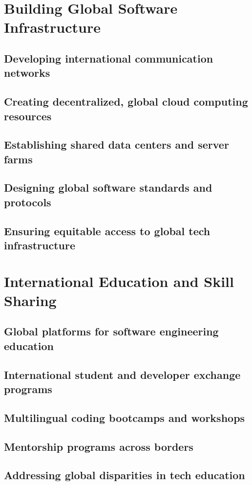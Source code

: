 \section{Building Global Software Infrastructure}
\subsection{Developing international communication networks}
\subsection{Creating decentralized, global cloud computing resources}
\subsection{Establishing shared data centers and server farms}
\subsection{Designing global software standards and protocols}
\subsection{Ensuring equitable access to global tech infrastructure}

\newpage

\section{International Education and Skill Sharing}
\subsection{Global platforms for software engineering education}
\subsection{International student and developer exchange programs}
\subsection{Multilingual coding bootcamps and workshops}
\subsection{Mentorship programs across borders}
\subsection{Addressing global disparities in tech education}

